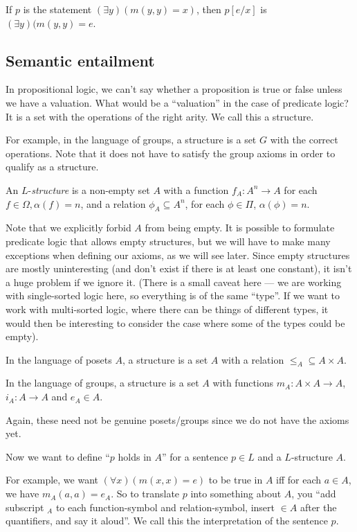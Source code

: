 \documentclass[a4paper]{article}
\begin{document}
\begin{eg}
  If $p$ is the statement $(\exists y)(m(y, y) = x)$, then $p[e/x]$ is $(\exists y)(m(y, y) = e$.
\end{eg}
\subsection{Semantic entailment}
In propositional logic, we can't say whether a proposition is true or false unless we have a valuation. What would be a ``valuation'' in the case of predicate logic? It is a set with the operations of the right arity. We call this a structure.

For example, in the language of groups, a structure is a set $G$ with the correct operations. Note that it does not have to satisfy the group axioms in order to qualify as a structure.

\begin{defi}[Structure]
  An $L$-\emph{structure} is a non-empty set $A$ with a function $f_A: A^n \to A$ for each $f\in \Omega, \alpha(f) = n$, and a relation $\phi_A\subseteq A^n$, for each $\phi\in \Pi$, $\alpha(\phi) = n$.
\end{defi}
Note that we explicitly forbid $A$ from being empty. It is possible to formulate predicate logic that allows empty structures, but we will have to make many exceptions when defining our axioms, as we will see later. Since empty structures are mostly uninteresting (and don't exist if there is at least one constant), it isn't a huge problem if we ignore it. (There is a small caveat here --- we are working with single-sorted logic here, so everything is of the same ``type''. If we want to work with multi-sorted logic, where there can be things of different types, it would then be interesting to consider the case where some of the types could be empty).

\begin{eg}
  In the language of posets $A$, a structure is a set $A$ with a relation $\leq_A \subseteq A\times A$.

  In the language of groups, a structure is a set $A$ with functions $m_A: A\times A\to A$, $i_A: A\to A$ and $e_A\in A$.
\end{eg}
Again, these need not be genuine posets/groups since we do not have the axioms yet.

Now we want to define ``$p$ holds in $A$'' for a sentence $p\in L$ and a $L$-structure $A$.

For example, we want $(\forall x)(m(x, x) = e)$ to be true in $A$ iff for each $a\in A$, we have $m_A(a, a) = e_A$. So to translate $p$ into something about $A$, you ``add subscript $_A$ to each function-symbol and relation-symbol, insert $\in A$ after the quantifiers, and say it aloud''. We call this the interpretation of the sentence $p$.
\end{document}
